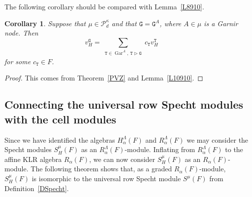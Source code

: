 \documentclass[twoside,11pt,reqno]{amsart}
\numberwithin{equation}{section}
\newtheorem{Corollary}[equation]{Corollary}
\theoremstyle{definition}  %
\newcommand\Comment[2][\relax]{\space\par\medskip\noindent%
   \fbox{\begin{minipage}{\textwidth}\textbf{Comment\ifx\relax#1\else---#1\fi}\newline%
        #2\end{minipage}}\medskip
}
\DeclareMathOperator\gdom {\triangleright}
\newcommand{\0}{{\bar 0}}
\newcommand{\1}{{\bar 1}}
\newcommand{\La}{\Lambda}
\newcommand{\al}{\alpha}
\newcommand\Par[1][]{{\mathscr P}^{\kappa#1}}
\def\T{{\mathtt T}}
\def\G{{\mathtt G}}
\def\Gar{{\operatorname{Gar}}}
\begin{document}
The following corollary should be compared with Lemma~\ref{L8910}. 

\begin{Corollary} \label{C10910}%
Suppose that $\mu\in\Par_d$ and that $\G=\G^A$, where $A\in \mu$ is a Garnir node. Then 
$$
v_H^{\G}=\sum_{\substack{\T\in\Gar^A,\ \T\gdom \G}}c_\T v_H^\T\qquad
$$
for some $c_\T\in F$. 
\end{Corollary}
\begin{proof}
This comes from Theorem~\ref{PVZ} and Lemma~\ref{L10910}.
\end{proof}


\subsection{Connecting the universal row Specht modules with the cell modules}\label{SSconnection}
Since we have identified the algebras $H_\al^\La(F)$ and $R_\al^\La(F)$ we may consider the Specht modules $S^\mu_H(F)$ as
an $R_\al^\La(F)$-module. Inflating from $R_\al^\La(F)$ to the affine KLR algebra $R_\al(F)$, we can now
consider $S^\mu_H(F)$ as an $R_\al(F)$-module. The following theorem shows  that, as a graded $R_\alpha(F)$-module, $S^\mu_H(F)$ is
isomorphic to the universal row Specht module $S^\mu(F)$ from Definition~\ref{DSpecht}.
\end{document}

